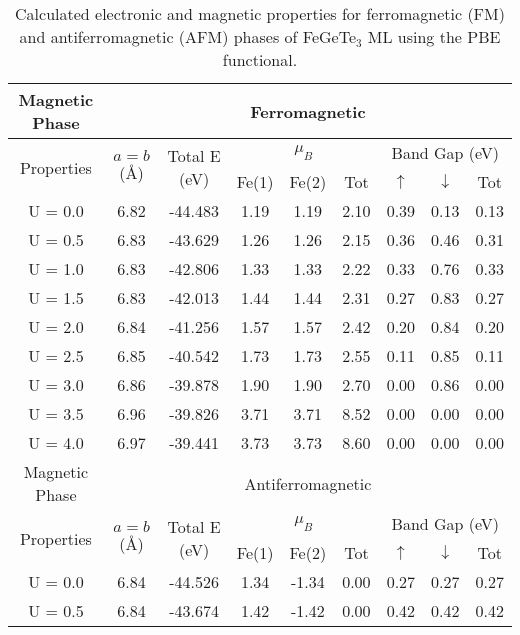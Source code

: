 \begin{table}[H]
	\centering
	\setlength{\extrarowheight}{0.5ex}
	\caption{Calculated electronic and magnetic properties for ferromagnetic (FM) and antiferromagnetic (AFM) phases of FeGeTe$_3$ ML using the PBE functional.}
	\begin{tabular}{cccccc|ccc}
		\toprule
		\toprule
		\rowcolor{WhiteSmoke!70!Lavender}
		Magnetic Phase & \multicolumn{8}{c}{Ferromagnetic} \\
		\midrule
		\multirow{2}{*}{Properties} & \multirow{2}{*}{$a=b$ (\AA)} & \multirow{2}{*}{Total E (eV)} & \multicolumn{3}{c}{$\mu_{B}$} & \multicolumn{3}{c}{Band Gap (eV)} \\
		\cline{4-9}
		& & & Fe(1) & Fe(2) & Tot & $\uparrow$ & $\downarrow$ & Tot \\
		\midrule
		U = 0.0 & 6.82 & -44.483 & 1.19 & 1.19 & 2.10 & 0.39 & 0.13 & 0.13 \\
		U = 0.5 & 6.83 & -43.629 & 1.26 & 1.26 & 2.15 & 0.36 & 0.46 & 0.31 \\
		U = 1.0 & 6.83 & -42.806 & 1.33 & 1.33 & 2.22 & 0.33 & 0.76 & 0.33 \\
		U = 1.5 & 6.83 & -42.013 & 1.44 & 1.44 & 2.31 & 0.27 & 0.83 & 0.27 \\
		U = 2.0 & 6.84 & -41.256 & 1.57 & 1.57 & 2.42 & 0.20 & 0.84 & 0.20 \\
		U = 2.5 & 6.85 & -40.542 & 1.73 & 1.73 & 2.55 & 0.11 & 0.85 & 0.11 \\
		U = 3.0 & 6.86 & -39.878 & 1.90 & 1.90 & 2.70 & 0.00 & 0.86 & 0.00 \\
		U = 3.5 & 6.96 & -39.826 & 3.71 & 3.71 & 8.52 & 0.00 & 0.00 & 0.00 \\
		U = 4.0 & 6.97 & -39.441 & 3.73 & 3.73 & 8.60 & 0.00 & 0.00 & 0.00 \\
		\midrule
		\rowcolor{WhiteSmoke!70!Lavender}
		Magnetic Phase & \multicolumn{8}{c}{Antiferromagnetic} \\
		\midrule
		\multirow{2}{*}{Properties} & \multirow{2}{*}{$a=b$ (\AA)} & \multirow{2}{*}{Total E (eV)} & \multicolumn{3}{c}{$\mu_{B}$} & \multicolumn{3}{c}{Band Gap (eV)} \\
		\cline{4-9}
		& & & Fe(1) & Fe(2) & Tot & $\uparrow$ & $\downarrow$ & Tot \\
		\midrule
		U = 0.0 & 6.84 & -44.526 & 1.34 & -1.34 & 0.00 & 0.27 & 0.27 & 0.27 \\
		U = 0.5 & 6.84 & -43.674 & 1.42 & -1.42 & 0.00 & 0.42 & 0.42 & 0.42 \\

\end{tabular}
\end{table}
